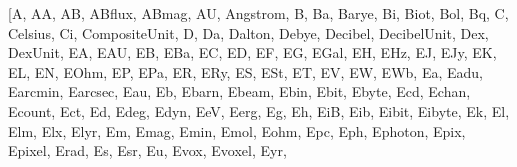 \documentclass[letterpaper,10pt,english]{sphinxmanual}
\begin{document}
\begin{sphinxVerbatim}[commandchars=\\\{\}]
[\PYGZsq{}A\PYGZsq{},
 \PYGZsq{}AA\PYGZsq{},
 \PYGZsq{}AB\PYGZsq{},
 \PYGZsq{}ABflux\PYGZsq{},
 \PYGZsq{}ABmag\PYGZsq{},
 \PYGZsq{}AU\PYGZsq{},
 \PYGZsq{}Angstrom\PYGZsq{},
 \PYGZsq{}B\PYGZsq{},
 \PYGZsq{}Ba\PYGZsq{},
 \PYGZsq{}Barye\PYGZsq{},
 \PYGZsq{}Bi\PYGZsq{},
 \PYGZsq{}Biot\PYGZsq{},
 \PYGZsq{}Bol\PYGZsq{},
 \PYGZsq{}Bq\PYGZsq{},
 \PYGZsq{}C\PYGZsq{},
 \PYGZsq{}Celsius\PYGZsq{},
 \PYGZsq{}Ci\PYGZsq{},
 \PYGZsq{}CompositeUnit\PYGZsq{},
 \PYGZsq{}D\PYGZsq{},
 \PYGZsq{}Da\PYGZsq{},
 \PYGZsq{}Dalton\PYGZsq{},
 \PYGZsq{}Debye\PYGZsq{},
 \PYGZsq{}Decibel\PYGZsq{},
 \PYGZsq{}DecibelUnit\PYGZsq{},
 \PYGZsq{}Dex\PYGZsq{},
 \PYGZsq{}DexUnit\PYGZsq{},
 \PYGZsq{}EA\PYGZsq{},
 \PYGZsq{}EAU\PYGZsq{},
 \PYGZsq{}EB\PYGZsq{},
 \PYGZsq{}EBa\PYGZsq{},
 \PYGZsq{}EC\PYGZsq{},
 \PYGZsq{}ED\PYGZsq{},
 \PYGZsq{}EF\PYGZsq{},
 \PYGZsq{}EG\PYGZsq{},
 \PYGZsq{}EGal\PYGZsq{},
 \PYGZsq{}EH\PYGZsq{},
 \PYGZsq{}EHz\PYGZsq{},
 \PYGZsq{}EJ\PYGZsq{},
 \PYGZsq{}EJy\PYGZsq{},
 \PYGZsq{}EK\PYGZsq{},
 \PYGZsq{}EL\PYGZsq{},
 \PYGZsq{}EN\PYGZsq{},
 \PYGZsq{}EOhm\PYGZsq{},
 \PYGZsq{}EP\PYGZsq{},
 \PYGZsq{}EPa\PYGZsq{},
 \PYGZsq{}ER\PYGZsq{},
 \PYGZsq{}ERy\PYGZsq{},
 \PYGZsq{}ES\PYGZsq{},
 \PYGZsq{}ESt\PYGZsq{},
 \PYGZsq{}ET\PYGZsq{},
 \PYGZsq{}EV\PYGZsq{},
 \PYGZsq{}EW\PYGZsq{},
 \PYGZsq{}EWb\PYGZsq{},
 \PYGZsq{}Ea\PYGZsq{},
 \PYGZsq{}Eadu\PYGZsq{},
 \PYGZsq{}Earcmin\PYGZsq{},
 \PYGZsq{}Earcsec\PYGZsq{},
 \PYGZsq{}Eau\PYGZsq{},
 \PYGZsq{}Eb\PYGZsq{},
 \PYGZsq{}Ebarn\PYGZsq{},
 \PYGZsq{}Ebeam\PYGZsq{},
 \PYGZsq{}Ebin\PYGZsq{},
 \PYGZsq{}Ebit\PYGZsq{},
 \PYGZsq{}Ebyte\PYGZsq{},
 \PYGZsq{}Ecd\PYGZsq{},
 \PYGZsq{}Echan\PYGZsq{},
 \PYGZsq{}Ecount\PYGZsq{},
 \PYGZsq{}Ect\PYGZsq{},
 \PYGZsq{}Ed\PYGZsq{},
 \PYGZsq{}Edeg\PYGZsq{},
 \PYGZsq{}Edyn\PYGZsq{},
 \PYGZsq{}EeV\PYGZsq{},
 \PYGZsq{}Eerg\PYGZsq{},
 \PYGZsq{}Eg\PYGZsq{},
 \PYGZsq{}Eh\PYGZsq{},
 \PYGZsq{}EiB\PYGZsq{},
 \PYGZsq{}Eib\PYGZsq{},
 \PYGZsq{}Eibit\PYGZsq{},
 \PYGZsq{}Eibyte\PYGZsq{},
 \PYGZsq{}Ek\PYGZsq{},
 \PYGZsq{}El\PYGZsq{},
 \PYGZsq{}Elm\PYGZsq{},
 \PYGZsq{}Elx\PYGZsq{},
 \PYGZsq{}Elyr\PYGZsq{},
 \PYGZsq{}Em\PYGZsq{},
 \PYGZsq{}Emag\PYGZsq{},
 \PYGZsq{}Emin\PYGZsq{},
 \PYGZsq{}Emol\PYGZsq{},
 \PYGZsq{}Eohm\PYGZsq{},
 \PYGZsq{}Epc\PYGZsq{},
 \PYGZsq{}Eph\PYGZsq{},
 \PYGZsq{}Ephoton\PYGZsq{},
 \PYGZsq{}Epix\PYGZsq{},
 \PYGZsq{}Epixel\PYGZsq{},
 \PYGZsq{}Erad\PYGZsq{},
 \PYGZsq{}Es\PYGZsq{},
 \PYGZsq{}Esr\PYGZsq{},
 \PYGZsq{}Eu\PYGZsq{},
 \PYGZsq{}Evox\PYGZsq{},
 \PYGZsq{}Evoxel\PYGZsq{},
 \PYGZsq{}Eyr\PYGZsq{},

\end{sphinxVerbatim}
\end{document}
